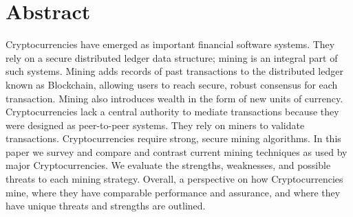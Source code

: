 \chapter*{Abstract}
Cryptocurrencies have emerged as important financial software systems. They rely on a secure distributed ledger data structure; mining is an integral part of such systems. Mining adds records of past transactions to the distributed ledger known as Blockchain, allowing users to reach secure, robust consensus for each transaction. Mining also introduces wealth in the form of new units of currency. Cryptocurrencies lack a central authority to mediate transactions because they were designed as peer-to-peer systems. They rely on miners to validate transactions. Cryptocurrencies require strong, secure mining algorithms. In this paper we survey and compare and contrast current mining techniques as used by major Cryptocurrencies. We evaluate the strengths, weaknesses, and possible threats to each mining strategy. Overall, a perspective on how Cryptocurrencies mine, where they have comparable performance and assurance, and where they have unique threats and strengths are outlined.